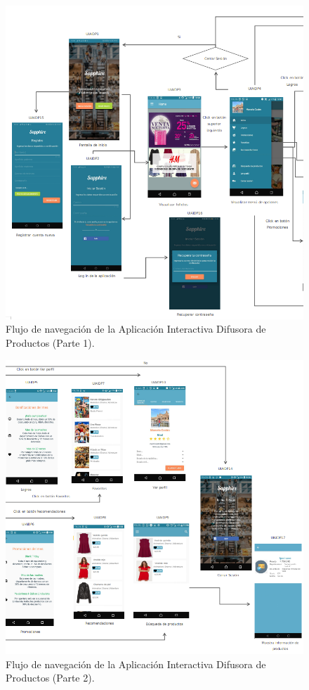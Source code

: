 \FloatBarrier
\begin{figure}[htbp!]
		\centering
			\includegraphics[width=1 \textwidth]{imagenes/UI_userapp/mapaNavP1}
		\caption{Flujo de navegación de la Aplicación Interactiva Difusora de Productos (Parte 1).}
		\label{Image:FlujoNavegacion2}
\end{figure}
\FloatBarrier

\FloatBarrier
\begin{figure}[htbp!]
		\centering
			\includegraphics[width=1 \textwidth]{imagenes/UI_userapp/mapaNavP2}
		\caption{Flujo de navegación de la Aplicación Interactiva Difusora de Productos (Parte 2).}
		\label{Image:FlujoNavegacion3}
\end{figure}
\FloatBarrier

